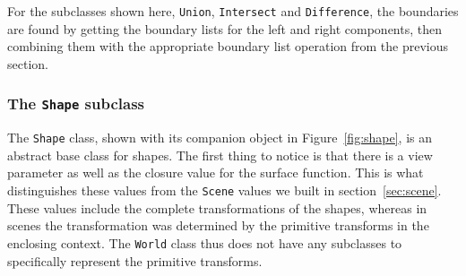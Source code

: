For the subclasses shown here,
\verb!Union!, \verb!Intersect! and \verb!Difference!,
the boundaries are found by
getting the boundary lists for the left and right components,
then combining them with
the appropriate boundary list operation from the previous section.

\subsubsection{The \texttt{Shape} subclass\label{sec:shape}}

The \verb!Shape! class,
shown with its companion object in Figure~\ref{fig:shape},
is an abstract base class for shapes.
The first thing to notice is that there is a view parameter as well as
the closure value for the surface function.
This is what distinguishes these values from
the \verb!Scene! values we built in section~\ref{sec:scene}.
These values include the complete transformations of the shapes,
whereas in scenes the transformation was determined by
the primitive transforms in the enclosing context.
The \verb!World! class thus does not have any subclasses
to specifically represent the primitive transforms.

